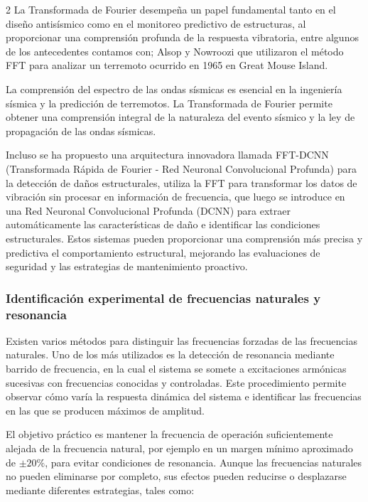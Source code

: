 \documentclass[10pt]{article}
\begin{document}
\begin{multicols}{2}
La Transformada de Fourier desempeña un papel fundamental tanto en el diseño antisísmico como en el monitoreo predictivo de estructuras, al proporcionar
una comprensión profunda de la respuesta vibratoria, entre algunos de los antecedentes contamos con; Alsop y Nowroozi que utilizaron el método FFT para analizar un terremoto ocurrido en 1965 en Great Mouse Island.

La comprensión del espectro de las ondas sísmicas es esencial en la ingeniería sísmica y la predicción de terremotos. La Transformada de Fourier permite obtener una comprensión integral de la naturaleza del evento sísmico y la ley de propagación de las ondas sísmicas.

Incluso se ha propuesto una arquitectura innovadora llamada FFT-DCNN
(Transformada Rápida de Fourier - Red Neuronal Convolucional Profunda) para la detección de daños estructurales, utiliza la FFT para transformar los datos de vibración sin procesar en información de frecuencia, que luego se introduce en una Red Neuronal Convolucional Profunda (DCNN) para extraer automáticamente las características de daño e identificar las condiciones estructurales. Estos sistemas pueden proporcionar una comprensión más precisa y predictiva el comportamiento estructural, mejorando las evaluaciones de seguridad y las estrategias de mantenimiento proactivo.


\subsubsection{Identificación experimental de frecuencias naturales y resonancia}
Existen varios métodos para distinguir las frecuencias forzadas de las frecuencias naturales. Uno de los más utilizados es la detección de resonancia mediante barrido de frecuencia, en la cual el sistema se somete a excitaciones armónicas sucesivas con frecuencias conocidas y controladas. Este procedimiento permite observar cómo varía la respuesta dinámica del sistema e identificar las frecuencias en las que se producen máximos de amplitud.

El objetivo práctico es mantener la frecuencia de operación suficientemente alejada de la frecuencia natural, por ejemplo en un margen mínimo aproximado de $\pm 20\%$, para evitar condiciones de resonancia. Aunque las frecuencias naturales no pueden eliminarse por completo, sus efectos pueden reducirse o desplazarse mediante diferentes estrategias, tales como:


\end{multicols}
\end{document}
